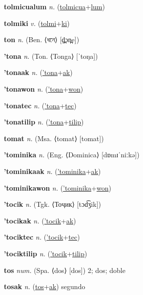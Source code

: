 \textbf{\hypertarget{tolmicualum}{tolmicualum}} \textit{n.} (\hyperlink{tolmicua}{tolmicua}+\allowbreak \hyperlink{lum}{lum})


\textbf{\hypertarget{tolmiki}{tolmiki}} \textit{v.} (\hyperlink{tolmi}{tolmi}+\allowbreak \hyperlink{ki}{ki})


\textbf{\hypertarget{ton}{ton}} \textit{n.} (Ben. ⟨{\bengali{}ধনে}⟩ [d̪̤ɔn̪e])


\textbf{\hypertarget{'tona}{'tona}} \textit{n.} (Ton. ⟨Tonga⟩ [ˈtoŋa])


\textbf{\hypertarget{'tonaak}{'tonaak}} \textit{n.} (\hyperlink{'tona}{'tona}+\allowbreak \hyperlink{ak}{ak})


\textbf{\hypertarget{'tonawon}{'tonawon}} \textit{n.} (\hyperlink{'tona}{'tona}+\allowbreak \hyperlink{won}{won})


\textbf{\hypertarget{'tonatec}{'tonatec}} \textit{n.} (\hyperlink{'tona}{'tona}+\allowbreak \hyperlink{tec}{tec})


\textbf{\hypertarget{'tonatilip}{'tonatilip}} \textit{n.} (\hyperlink{'tona}{'tona}+\allowbreak \hyperlink{tilip}{tilip})


\textbf{\hypertarget{tomat}{tomat}} \textit{n.} (Msa. ⟨tomat⟩ [tomat])


\textbf{\hypertarget{'tominika}{'tominika}} \textit{n.} (Eng. ⟨Dominica⟩ [dɒmɪˈniːkə])


\textbf{\hypertarget{'tominikaak}{'tominikaak}} \textit{n.} (\hyperlink{'tominika}{'tominika}+\allowbreak \hyperlink{ak}{ak})


\textbf{\hypertarget{'tominikawon}{'tominikawon}} \textit{n.} (\hyperlink{'tominika}{'tominika}+\allowbreak \hyperlink{won}{won})


\textbf{\hypertarget{'tocik}{'tocik}} \textit{n.} (Tgk. ⟨Тоҷик⟩ [tɔd͡ʒik])


\textbf{\hypertarget{'tocikak}{'tocikak}} \textit{n.} (\hyperlink{'tocik}{'tocik}+\allowbreak \hyperlink{ak}{ak})


\textbf{\hypertarget{'tociktec}{'tociktec}} \textit{n.} (\hyperlink{'tocik}{'tocik}+\allowbreak \hyperlink{tec}{tec})


\textbf{\hypertarget{'tociktilip}{'tociktilip}} \textit{n.} (\hyperlink{'tocik}{'tocik}+\allowbreak \hyperlink{tilip}{tilip})


\textbf{\hypertarget{tos}{tos}} \textit{num.} (Spa. ⟨dos⟩ [dos])
2; dos; doble

\textbf{\hypertarget{tosak}{tosak}} \textit{n.} (\hyperlink{tos}{tos}+\allowbreak \hyperlink{ak}{ak})
segundo

